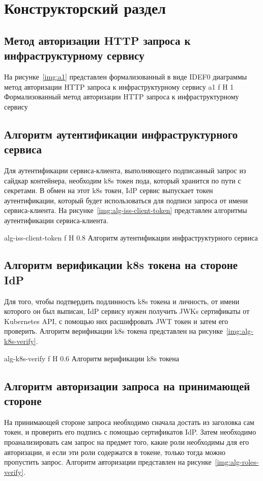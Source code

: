 \chapter{Конструкторский раздел}

\section{Метод авторизации HTTP запроса к инфраструктурному сервису}
На рисунке~\ref{img:a1} представлен формализованный в виде IDEF0 диаграммы метод авторизации HTTP запроса к инфраструктурному сервису
    {a1}
    {f}
    {H}
    {1\textwidth}
    {Формализованный метод авторизации HTTP запроса к инфраструктурному сервису}


\section{Алгоритм аутентификации инфраструктурного сервиса}
Для аутентификации сервиса-клиента, выполняющего подписанный запрос из сайдкар контейнера, необходим k8s токен пода, который хранится по пути с секретами. В обмен на этот k8s токен, IdP сервис выпускает токен аутентификации, который будет использоваться для подписи запроса от имени сервиса-клиента. На рисунке~\ref{img:alg-iss-client-token} представлен алгоритмы аутентификации сервиса-клиента.

    {alg-iss-client-token}
    {f}
    {H}
    {0.8\textwidth}
    {Алгоритм аутентификации инфраструктурного сервиса}


\section{Алгоритм верификации k8s токена на стороне IdP}
Для того, чтобы подтвердить подлинность k8s токена и личность, от имени которого он был выписан, IdP сервису нужен получить JWKs сертификаты от Kubernetes API, с помощью них расшифровать JWT токен и затем его проверить. Алгоритм верификации k8s токена представлен на рисунке~\ref{img:alg-k8s-verify}.

    {alg-k8s-verify}
    {f}
    {H}
    {0.6\textwidth}
    {Алгоритм верификации k8s токена}
    

\section{Алгоритм авторизации запроса на принимающей стороне}
На принимающей стороне запроса необходимо сначала достать из заголовка сам токен, и проверить его подпись с помощью сертификатов IdP. Затем необходимо проанализировать сам запрос на предмет того, какие роли необходимы для его авторизации, и если эти роли содержатся в токене, только тогда можно пропустить запрос. Алгоритм авторизации представлен на рисунке~\ref{img:alg-roles-verify}.

